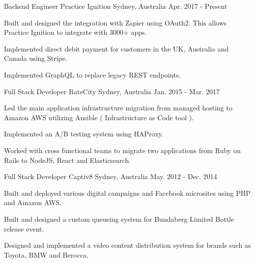 
\begin{cventries}

  \cventry
    {Backend Engineer} %
    {Practice Ignition} %
    {Sydney, Australia} %
    {Apr. 2017 - Present} %
    {
      \begin{cvitems} %
        \item {Built and designed the integration with Zapier using OAuth2. This allows Practice Ignition to integrate with 3000+ apps. }
        \item {Implemented direct debit payment for customers in the UK, Australia and Canada using Stripe.}
        \item {Implemented GraphQL to replace legacy REST endpoints.}
      \end{cvitems}
    }

  \cventry
    {Full Stack Developer} %
    {RateCity} %
    {Sydney, Australia} %
    {Jan. 2015 - Mar. 2017} %
    {
      \begin{cvitems} %
      \item {Led the main application infrastructure migration from managed hosting to Amazon AWS utilizing Ansible ( Infrastructure as Code tool ).}
        \item {Implemented an A/B testing system using HAProxy.}
        \item {Worked with cross functional teams to migrate two applications from Ruby on Rails to NodeJS, React and Elasticsearch.}
      \end{cvitems}
    }

  \cventry
    {Full Stack Developer} %
    {Captiv8} %
    {Sydney, Australia} %
    {May. 2012 - Dec. 2014} %
    {
      \begin{cvitems} %
        \item {Built and deployed various digital campaigns and Facebook microsites using PHP and Amazon AWS.}
        \item {Built and designed a custom queueing system for Bundaberg Limited Bottle release event.}
        \item {Designed and implemented a video content distribution system for brands such as Toyota, BMW and Berocca.}
      \end{cvitems}
    }


\end{cventries}
